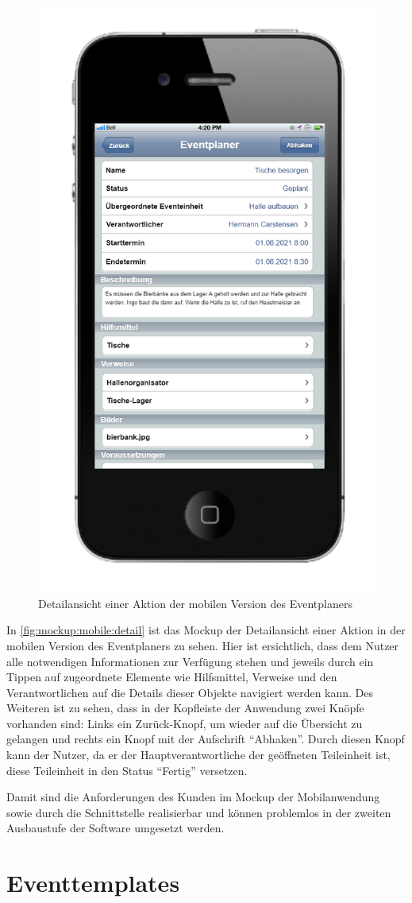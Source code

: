 \begin{figure}[ht!]
    \centering
    \includegraphics[width=0.4\columnwidth]{Bilder/mockup_mobile_object_page.png}
    \caption{Detailansicht einer Aktion der mobilen Version des Eventplaners}
    \label{fig:mockup:mobile:detail}
\end{figure}

In \autoref{fig:mockup:mobile:detail} ist das Mockup der Detailansicht einer Aktion in der mobilen Version des Eventplaners zu sehen. Hier ist ersichtlich, dass dem Nutzer alle notwendigen Informationen zur Verfügung stehen und jeweils durch ein Tippen auf zugeordnete Elemente wie Hilfsmittel, Verweise und den Verantwortlichen auf die Details dieser Objekte navigiert werden kann. Des Weiteren ist zu sehen, dass in der Kopfleiste der Anwendung zwei Knöpfe vorhanden sind: Links ein Zurück-Knopf, um wieder auf die Übersicht zu gelangen und rechts ein Knopf mit der Aufschrift \enquote{Abhaken}. Durch diesen Knopf kann der Nutzer, da er der Hauptverantwortliche der geöffneten Teileinheit ist, diese Teileinheit in den Status \enquote{Fertig} versetzen.

Damit sind die Anforderungen des Kunden im Mockup der Mobilanwendung sowie durch die Schnittstelle realisierbar und können problemlos in der zweiten Ausbaustufe der Software umgesetzt werden.

\FloatBarrier
\section{Eventtemplates}

